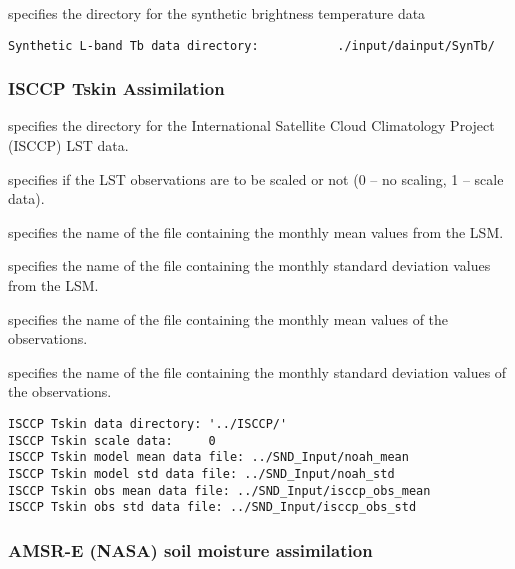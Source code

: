  
  specifies the directory
 for the synthetic brightness temperature data
 

 \begin{Verbatim}[frame=single]
Synthetic L-band Tb data directory:           ./input/dainput/SynTb/
 \end{Verbatim}
 

 
 
 \subsubsection{ISCCP Tskin Assimilation}
 \label{sssec:isccptskinda}
 

 
  specifies the directory for the
 International Satellite Cloud Climatology Project (ISCCP) LST data.

  specifies if the LST observations
 are to be scaled or not (0 -- no scaling, 1 -- scale data).

  specifies the name of the 
 file containing the monthly mean values from the LSM.

  specifies the name of the 
 file containing the monthly standard deviation values from the LSM.

  specifies the name of the 
 file containing the monthly mean values of the observations.

  specifies the name of the 
 file containing the monthly standard deviation values of the
 observations.
 

 \begin{Verbatim}[frame=single]
ISCCP Tskin data directory: '../ISCCP/'
ISCCP Tskin scale data:     0
ISCCP Tskin model mean data file: ../SND_Input/noah_mean
ISCCP Tskin model std data file: ../SND_Input/noah_std
ISCCP Tskin obs mean data file: ../SND_Input/isccp_obs_mean
ISCCP Tskin obs std data file: ../SND_Input/isccp_obs_std
 \end{Verbatim}
 

 
 \subsubsection{AMSR-E (NASA) soil moisture assimilation}
 \label{sssec:nasaamsreda}
 

